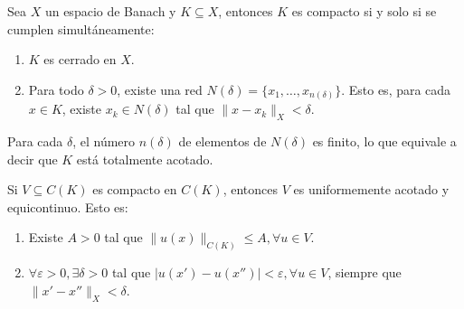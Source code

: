 \begin{lema}\label{lm:p05}
Sea $X$ un espacio de Banach y \(K \subseteq X\), entonces $K$ es compacto si y solo si se cumplen simultáneamente: 
\begin{enumerate}
  \item $K$ es cerrado en $X$.
  \item  Para todo $ \delta > 0$, existe una red $N(\delta ) = \{ x_{1}, \ldots, x_{n(\delta ) } \}$. Esto es, para cada \( x \in K\), existe \(x_{k} \in N(\delta ) \) tal que \( \parallel x - x_{k} \parallel_{X} < \delta\).
\end{enumerate}
\end{lema}
\begin{observacion}
Para cada $\delta$, el número $n(\delta)$ de elementos de $N(\delta)$ es finito, lo que equivale a decir que $K$ está totalmente acotado. 
\end{observacion}
\begin{lema}\label{lm:p06}
Si \(V \subseteq C(K)\) es compacto en $C(K)$, entonces $V$ es uniformemente acotado y equicontinuo. Esto es: 
\begin{enumerate}
	\item Existe $A > 0$ tal que \(\parallel u(x)\parallel_{C(K)} \leq A, \forall u \in V\).
	\item $\forall \varepsilon > 0,   \exists\delta > 0$ tal que $\vert u(x')-u(x'')\vert < \varepsilon, \forall u\in V$, siempre que $\parallel x'-x''\parallel_{X} < \delta$.
\end{enumerate}
\end{lema}

